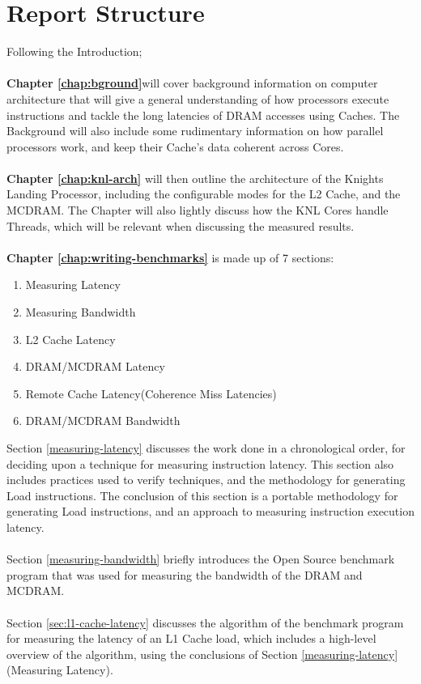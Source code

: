 \documentclass[bsc,frontabs,twoside,singlespacing,parskip,deptreport]{infthesis}     %
\begin{document}
\section{Report Structure}
Following the Introduction; \\
\\
\textbf{Chapter \ref{chap:bground}}will cover background information on computer architecture that will give a general understanding of how processors execute instructions and tackle the long latencies of DRAM accesses using Caches. The Background will also include some rudimentary information on how parallel processors work, and keep their Cache's data coherent across Cores. \\
\\
\textbf{Chapter \ref{chap:knl-arch}} will then outline the architecture of the Knights Landing Processor, including the configurable modes for the L2 Cache, and the MCDRAM. The Chapter will also lightly discuss how the KNL Cores handle Threads, which will be relevant when discussing the measured results. \\
\\
\textbf{Chapter \ref{chap:writing-benchmarks}} is made up of 7 sections:
\begin{enumerate}
    \item Measuring Latency
    \item Measuring Bandwidth
    \item L2 Cache Latency
    \item DRAM/MCDRAM Latency
    \item Remote Cache Latency(Coherence Miss Latencies)
    \item DRAM/MCDRAM Bandwidth
\end{enumerate}
Section \ref{measuring-latency} discusses the work done in a chronological order, for deciding upon a technique for measuring instruction latency. This section also includes practices used to verify techniques, and the methodology for generating Load instructions. The conclusion of this section is a portable methodology for generating Load instructions, and an approach to measuring instruction execution latency. \\
\\
Section \ref{measuring-bandwidth} briefly introduces the Open Source benchmark program that was used for measuring the bandwidth of the DRAM and MCDRAM. \\
\\
Section \ref{sec:l1-cache-latency} discusses the algorithm of the benchmark program for measuring the latency of an L1 Cache load, which includes a high-level overview of the algorithm, using the conclusions of Section \ref{measuring-latency}(Measuring Latency). \\
\end{document}
